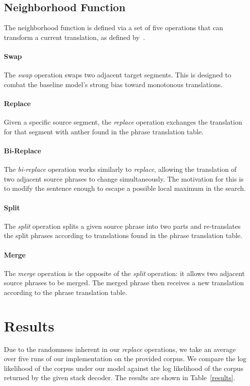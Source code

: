\documentclass[11pt,letterpaper]{article}
\begin{document}
\subsection{Neighborhood Function}
The neighborhood function is defined via a set of five operations that can transform a current translation,
as defined by~\cite{langlais2007greedy}.

\paragraph{Swap} The \textit{swap} operation swaps two adjacent target segments. This is designed to combat
the baseline model's strong bias toward monotonous translations.

\paragraph{Replace} Given a specific source segment, the \textit{replace} operation exchanges the translation
for that segment with anther found in the phrase translation table.

\paragraph{Bi-Replace} The \textit{bi-replace} operation works similarly to \textit{replace}, allowing the
translation of two adjacent source phrases to change simultaneously. The motivation for this is to modify 
the sentence enough to escape a possible local maximum in the search.

\paragraph{Split} The \textit{split} operation splits a given source phrase into two parts and re-translates
the split phrases according to translations found in the phrase translation table.

\paragraph{Merge} The \textit{merge} operation is the opposite of the \textit{split} operation: it allows two
adjacent source phrases to be merged. The merged phrase then receives a new translation according to the phrase
translation table.


\section{Results}
Due to the randomness inherent in our \textit{replace} operations, we take an average over five runs of our implementation
on the provided corpus. We compare the log likelihood of the corpus under our model against the log likelihood of the corpus
returned by the given stack decoder. The results are shown in Table~\ref{results}.
\end{document}
